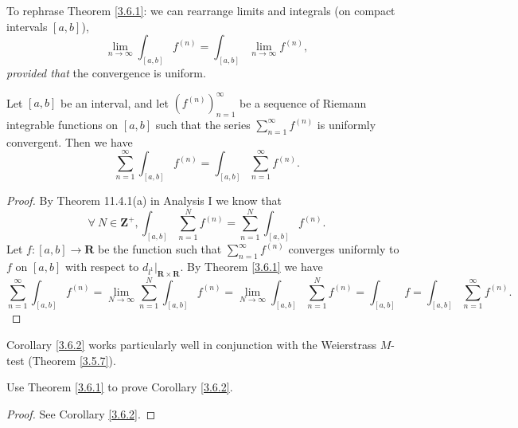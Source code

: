 \begin{note}
    To rephrase Theorem \ref{3.6.1}:
    we can rearrange limits and integrals (on compact intervals \([a, b]\)),
    \[
        \lim_{n \to \infty} \int_{[a, b]} f^{(n)} = \int_{[a, b]} \lim_{n \to \infty} f^{(n)},
    \]
    \emph{provided that} the convergence is uniform.
\end{note}

\begin{corollary}\label{3.6.2}
    Let \([a, b]\) be an interval, and let \((f^{(n)})_{n = 1}^\infty\) be a sequence of Riemann integrable functions on \([a, b]\) such that the series \(\sum_{n = 1}^\infty f^{(n)}\) is uniformly convergent.
    Then we have
    \[
        \sum_{n = 1}^\infty \int_{[a, b]} f^{(n)} = \int_{[a, b]} \sum_{n = 1}^\infty f^{(n)}.
    \]
\end{corollary}

\begin{proof}
    By Theorem 11.4.1(a) in Analysis I we know that
    \[
        \forall\ N \in \mathbf{Z}^+, \int_{[a, b]} \sum_{n = 1}^N f^{(n)} = \sum_{n = 1}^N \int_{[a, b]} f^{(n)}.
    \]
    Let \(f : [a, b] \to \mathbf{R}\) be the function such that \(\sum_{n = 1}^\infty f^{(n)}\) converges uniformly to \(f\) on \([a, b]\) with respect to \(d_{l^1}|_{\mathbf{R} \times \mathbf{R}}\).
    By Theorem \ref{3.6.1} we have
    \[
        \sum_{n = 1}^\infty \int_{[a, b]} f^{(n)} = \lim_{N \to \infty} \sum_{n = 1}^N \int_{[a, b]} f^{(n)} = \lim_{N \to \infty} \int_{[a, b]} \sum_{n = 1}^N f^{(n)} = \int_{[a, b]} f = \int_{[a, b]} \sum_{n = 1}^\infty f^{(n)}.
    \]
\end{proof}

\begin{note}
    Corollary \ref{3.6.2} works particularly well in conjunction with the Weierstrass \(M\)-test
    (Theorem \ref{3.5.7}).
\end{note}

\exercisesection

\begin{exercise}\label{ex 3.6.1}
    Use Theorem \ref{3.6.1} to prove Corollary \ref{3.6.2}.
\end{exercise}

\begin{proof}
    See Corollary \ref{3.6.2}.
\end{proof}